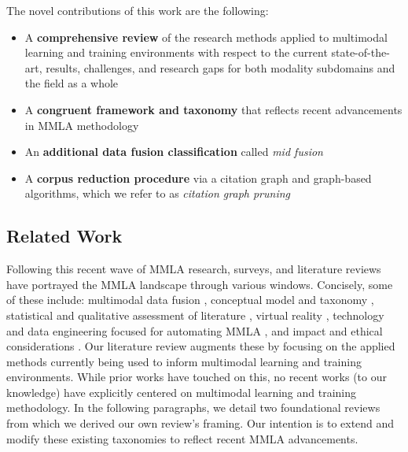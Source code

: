 \documentclass[manuscript,screen,review]{acmart}
\begin{document}
The novel contributions of this work are the following: 
\begin{itemize}
    \item A \textbf{comprehensive review} of the research methods applied to multimodal learning and training environments with respect to the current state-of-the-art, results, challenges, and research gaps for both modality subdomains and the field as a whole
    \item A \textbf{congruent framework and taxonomy} that reflects recent advancements in MMLA methodology
    \item An \textbf{additional data fusion classification} called \textit{mid fusion}
    \item A \textbf{corpus reduction procedure} via a citation graph and graph-based algorithms, which we refer to as \textit{citation graph pruning}
\end{itemize}

\subsection{Related Work} \label{subsec:related_work}

Following this recent wave of MMLA research, surveys, and literature reviews have portrayed the MMLA landscape through various windows. Concisely, some of these include: multimodal data fusion \cite{Chango2022}, conceptual model and taxonomy \cite{DiMitri2018}, statistical and qualitative assessment of literature \cite{sharma_multimodal_2020, qushem_trends_2020}, virtual reality \cite{philippe_multimodal_2020}, technology and data engineering focused for automating MMLA \cite{chua_technologies_2019}, and impact and ethical considerations \cite{Alwahaby2022}. Our literature review augments these by focusing on the applied methods currently being used to inform multimodal learning and training environments. While prior works have touched on this, no recent works (to our knowledge) have explicitly centered on multimodal learning and training methodology. In the following paragraphs, we detail two foundational reviews from which we derived our own review's framing. Our intention is to extend and modify these existing taxonomies to reflect recent MMLA advancements. 
\end{document}
